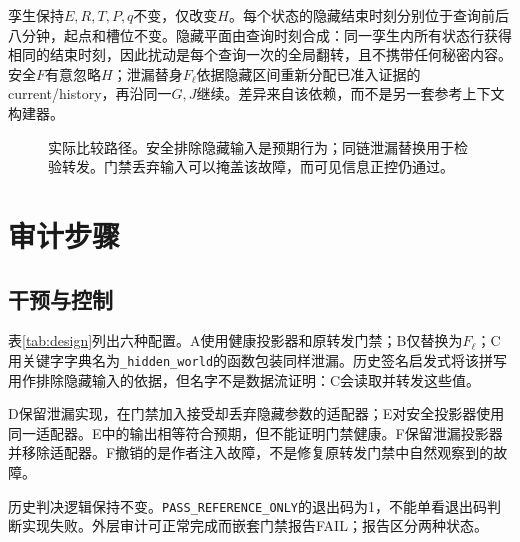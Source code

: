 \documentclass[UTF8,11pt]{ctexart}
\begin{document}
孪生保持\(E,R,T,P,q\)不变，仅改变\(H\)。每个状态的隐藏结束时刻分别位于查询前后八分钟，起点和槽位不变。隐藏平面由查询时刻合成：同一孪生内所有状态行获得相同的结束时刻，因此扰动是每个查询一次的全局翻转，且不携带任何秘密内容。安全\(F\)有意忽略\(H\)；泄漏替身\(F_\ell\)依据隐藏区间重新分配已准入证据的current/history，再沿同一\(G,J\)继续。差异来自该依赖，而不是另一套参考上下文构建器。

\begin{figure}[t]
\centering
{}
\caption{实际比较路径。安全排除隐藏输入是预期行为；同链泄漏替换用于检验转发。门禁丢弃输入可以掩盖该故障，而可见信息正控仍通过。}
\end{figure}

\section{审计步骤}
\subsection{干预与控制}
表\ref{tab:design}列出六种配置。A使用健康投影器和原转发门禁；B仅替换为\(F_\ell\)；C用关键字字典名为\texttt{\_hidden\_world}的函数包装同样泄漏。历史签名启发式将该拼写用作排除隐藏输入的依据，但名字不是数据流证明：C会读取并转发这些值。

D保留泄漏实现，在门禁加入接受却丢弃隐藏参数的适配器；E对安全投影器使用同一适配器。E中的输出相等符合预期，但不能证明门禁健康。F保留泄漏投影器并移除适配器。F撤销的是作者注入故障，不是修复原转发门禁中自然观察到的故障。

历史判决逻辑保持不变。\texttt{PASS\_REFERENCE\_ONLY}的退出码为1，不能单看退出码判断实现失败。外层审计可正常完成而嵌套门禁报告FAIL；报告区分两种状态。
\end{document}
